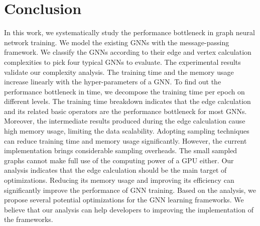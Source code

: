 \section{Conclusion}

In this work, we systematically study the performance bottleneck in graph neural network training.
We model the existing GNNs with the message-passing framework.
We classify the GNNs according to their edge and vertex calculation complexities to pick four typical GNNs to evaluate.
The experimental results validate our complexity analysis.
The training time and the memory usage increase linearly with the hyper-parameters of a GNN.
To find out the performance bottleneck in time, we decompose the training time per epoch on different levels.
The training time breakdown indicates that the edge calculation and its related basic operators are the performance bottleneck for most GNNs.
Moreover, the intermediate results produced during the edge calculation cause high memory usage, limiting the data scalability.
Adopting sampling techniques can reduce training time and memory usage significantly.
However, the current implementation brings considerable sampling overheads.
The small sampled graphs cannot make full use of the computing power of a GPU either.
Our analysis indicates that the edge calculation should be the main target of optimizations.
Reducing its memory usage and improving its efficiency can significantly improve the performance of GNN training.
Based on the analysis, we propose several potential optimizations for the GNN learning frameworks.
We believe that our analysis can help developers to improving the implementation of the frameworks.